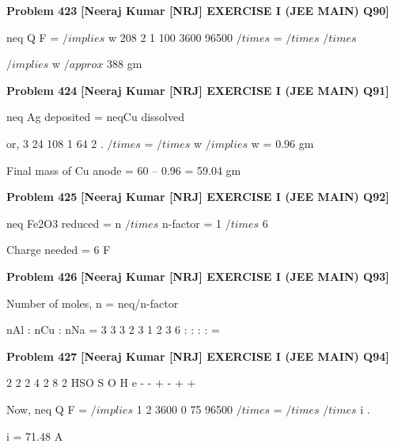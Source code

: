 \begin{problembox}
\textbf{Problem 423} \hfill \textbf{[Neeraj Kumar [NRJ] EXERCISE I (JEE MAIN) Q90]}
\label{q:ext-nrj_all_questions-423}

neq
Q
F
=
 $/implies$ w
208
2
1 100
3600
96500
$/times$
=
$/times$
$/times$
 
 
 $/implies$ w $/approx$ 388 gm
\end{problembox}

\begin{problembox}
\textbf{Problem 424} \hfill \textbf{[Neeraj Kumar [NRJ] EXERCISE I (JEE MAIN) Q91]}
\label{q:ext-nrj_all_questions-424}

neq Ag deposited = neqCu dissolved
 
 or, 3 24
108
1
64
2
.
$/times$ =
$/times$
w
 $/implies$ w = 0.96 gm
 
   Final mass of Cu anode = 60 -- 0.96 = 59.04 gm
\end{problembox}

\begin{problembox}
\textbf{Problem 425} \hfill \textbf{[Neeraj Kumar [NRJ] EXERCISE I (JEE MAIN) Q92]}
\label{q:ext-nrj_all_questions-425}

neq Fe2O3 reduced = n $/times$ n-factor = 1 $/times$ 6
 
   Charge needed = 6 F
\end{problembox}

\begin{problembox}
\textbf{Problem 426} \hfill \textbf{[Neeraj Kumar [NRJ] EXERCISE I (JEE MAIN) Q93]}
\label{q:ext-nrj_all_questions-426}

Number of moles, n = neq/n-factor
 
   nAl : nCu : nNa = 3
3
3
2
3
1
2 3 6
:
:
:
:
=
\end{problembox}

\begin{problembox}
\textbf{Problem 427} \hfill \textbf{[Neeraj Kumar [NRJ] EXERCISE I (JEE MAIN) Q94]}
\label{q:ext-nrj_all_questions-427}

2
2
2
4
2
8
2
HSO
S O
H
e
-
-
+
-
+
+

  


 



 
 Now, neq
Q
F
=
 $/implies$ 1
2
3600
0 75
96500
$/times$
=
$/times$
$/times$
i
.
 
 
   i = 71.48 A
\end{problembox}

